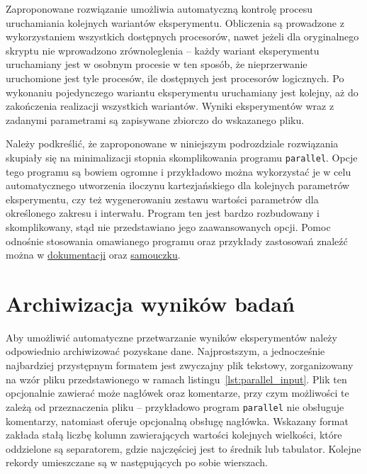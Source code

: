 \begin{listing}[htb]
\inputminted{bash}{skrypty/parallel_adcrun.sh}
\end{listing}
 
Zaproponowane rozwiązanie umożliwia automatyczną kontrolę procesu uruchamiania kolejnych wariantów eksperymentu. Obliczenia są prowadzone z wykorzystaniem wszystkich dostępnych procesorów, nawet jeżeli dla oryginalnego skryptu nie wprowadzono zrównoleglenia -- każdy wariant eksperymentu uruchamiany jest w osobnym procesie w ten sposób, że nieprzerwanie uruchomione jest tyle procesów, ile dostępnych jest procesorów logicznych. Po wykonaniu pojedynczego wariantu eksperymentu uruchamiany jest kolejny, aż do zakończenia realizacji wszystkich wariantów. Wyniki eksperymentów wraz z zadanymi parametrami są zapisywane zbiorczo do wskazanego pliku. 

Należy podkreślić, że zaproponowane w niniejszym podrozdziale rozwiązania skupiały się na minimalizacji stopnia skomplikowania programu \texttt{parallel}. Opcje tego programu są bowiem ogromne i przykładowo można wykorzystać je w celu automatycznego utworzenia iloczynu kartezjańskiego dla kolejnych parametrów eksperymentu, czy też wygenerowaniu zestawu wartości parametrów dla określonego zakresu i interwału. Program ten jest bardzo rozbudowany i skomplikowany, stąd nie przedstawiano jego zaawansowanych opcji. Pomoc odnośnie stosowania omawianego programu oraz przykłady zastosowań znaleźć można w \href{https://www.gnu.org/software/parallel/man.html}{dokumentacji} oraz \href{https://www.gnu.org/software/parallel/parallel_tutorial.html}{samouczku}.
 
\section{Archiwizacja wyników badań}

Aby umożliwić automatyczne przetwarzanie wyników eksperymentów należy odpowiednio archiwizować pozyskane dane. Najprostszym, a jednocześnie najbardziej przystępnym formatem jest zwyczajny plik tekstowy, zorganizowany na wzór pliku przedstawionego w ramach listingu~\ref{lst:parallel_input}. Plik ten opcjonalnie zawierać może nagłówek oraz komentarze, przy czym możliwości te zależą od przeznaczenia pliku -- przykładowo program \texttt{parallel} nie obsługuje komentarzy, natomiast oferuje opcjonalną obsługę nagłówka. Wskazany format zakłada stałą liczbę kolumn zawierających wartości kolejnych wielkości, które oddzielone są separatorem, gdzie najczęściej jest to średnik lub tabulator. Kolejne rekordy umieszczane są w następujących po sobie wierszach.

